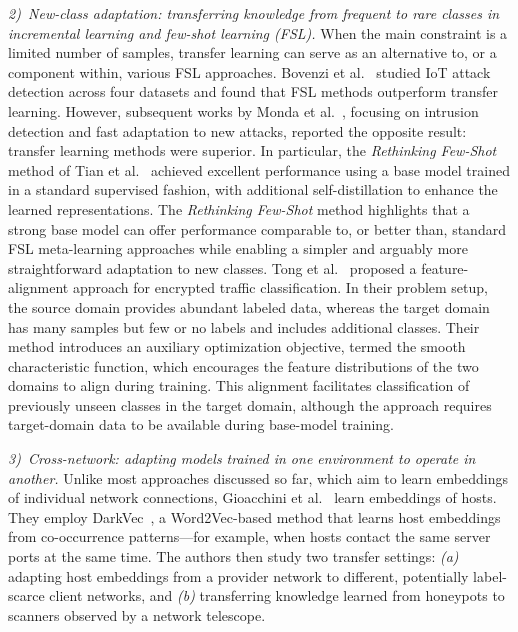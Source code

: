 \documentclass[lettersize,journal,twoside,article]{IEEEtran}
\begin{document}
\textit{2)~New-class adaptation: transferring knowledge from frequent to rare classes in incremental learning and few-shot learning (FSL).} When the main constraint is a limited number of samples, transfer learning can serve as an alternative to, or a component within, various FSL approaches. Bovenzi et al.~\cite{Bovenzi2024Attack} studied IoT attack detection across four datasets and found that FSL methods outperform transfer learning. However, subsequent works by Monda et al.~\cite{Monda2024Few, Monda2024Botnet}, focusing on intrusion detection and fast adaptation to new attacks, reported the opposite result: transfer learning methods were superior. In particular, the \textit{Rethinking Few-Shot} method of Tian et al.~\cite{Tian2020RFS} achieved excellent performance using a base model trained in a standard supervised fashion, with additional self-distillation to enhance the learned representations. The \textit{Rethinking Few-Shot} method highlights that a strong base model can offer performance comparable to, or better than, standard FSL meta-learning approaches while enabling a simpler and arguably more straightforward adaptation to new classes. Tong et al.~\cite{Tong2025Adaptation} proposed a feature-alignment approach for encrypted traffic classification. In their problem setup, the source domain provides abundant labeled data, whereas the target domain has many samples but few or no labels and includes additional classes. Their method introduces an auxiliary optimization objective, termed the smooth characteristic function, which encourages the feature distributions of the two domains to align during training. This alignment facilitates classification of previously unseen classes in the target domain, although the approach requires target-domain data to be available during base-model training. 

\textit{3)~Cross-network: adapting models trained in one environment to operate in another.} Unlike most approaches discussed so far, which aim to learn embeddings of individual network connections, Gioacchini et al.~\cite{Gioacchini2024Cross} learn embeddings of hosts. They employ DarkVec~\cite{Gioacchini2021Darknet}, a Word2Vec-based method that learns host embeddings from co-occurrence patterns---for example, when hosts contact the same server ports at the same time. The authors then study two transfer settings: \textit{(a)} adapting host embeddings from a provider network to different, potentially label-scarce client networks, and \textit{(b)} transferring knowledge learned from honeypots to scanners observed by a network telescope.
\end{document}
